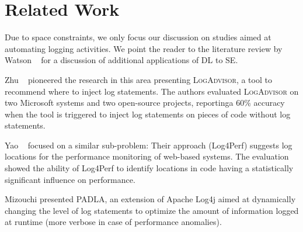 \section{Related Work} \label{sec:related}

Due to space constraints, we only focus our discussion on studies aimed at automating logging activities. We point the reader to the literature review by Watson \etal~\cite{watsonSytematicLiterature2020} for a discussion of additional applications of DL to SE.



Zhu \etal~\cite{zhu2015learning} pioneered the research in this area presenting \textsc{LogAdvisor}, a tool to recommend where to inject log statements. The authors evaluated \textsc{LogAdvisor} on two Microsoft systems and two open-source projects, reportinga 60\% accuracy when the tool is triggered to inject log statements on pieces of code without log statements.

Yao \etal~\cite{yao2018log4perf} focused on a similar sub-problem: Their approach (Log4Perf) suggests log locations for the performance monitoring of web-based systems. The evaluation showed the ability of Log4Perf to identify locations in code having a statistically significant influence on performance.

Mizouchi \etal \cite{mizouchi2019padla} presented \textsc{PADLA}, an extension of Apache Log4j aimed at dynamically changing the level of log statements to optimize the amount of information logged at runtime (\eg more verbose in case of performance anomalies).

